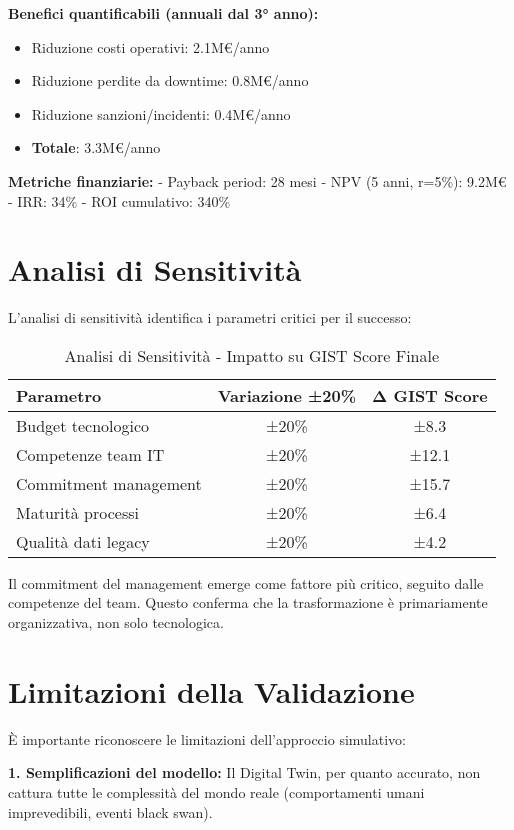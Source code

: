 \textbf{Benefici quantificabili (annuali dal 3° anno):}
\begin{itemize}
\item Riduzione costi operativi: 2.1M€/anno
\item Riduzione perdite da downtime: 0.8M€/anno
\item Riduzione sanzioni/incidenti: 0.4M€/anno
\item \textbf{Totale}: 3.3M€/anno
\end{itemize}

\textbf{Metriche finanziarie:}
- Payback period: 28 mesi
- NPV (5 anni, r=5\%): 9.2M€
- IRR: 34\%
- ROI cumulativo: 340\%

\section{Analisi di Sensitività}
\label{sec:sensitivita}

L'analisi di sensitività identifica i parametri critici per il successo:

\begin{table}[htbp]
\centering
\caption{Analisi di Sensitività - Impatto su GIST Score Finale}
\label{tab:sensitivity}
\begin{tabular}{lcc}
\toprule
\textbf{Parametro} & \textbf{Variazione ±20\%} & \textbf{Δ GIST Score} \\
\midrule
Budget tecnologico & ±20\% & ±8.3 \\
Competenze team IT & ±20\% & ±12.1 \\
Commitment management & ±20\% & ±15.7 \\
Maturità processi & ±20\% & ±6.4 \\
Qualità dati legacy & ±20\% & ±4.2 \\
\bottomrule
\end{tabular}
\end{table}

Il commitment del management emerge come fattore più critico, seguito dalle competenze del team. Questo conferma che la trasformazione è primariamente organizzativa, non solo tecnologica.

\section{Limitazioni della Validazione}
\label{sec:limitazioni}

È importante riconoscere le limitazioni dell'approccio simulativo:

\textbf{1. Semplificazioni del modello:} Il Digital Twin, per quanto accurato, non cattura tutte le complessità del mondo reale (comportamenti umani imprevedibili, eventi black swan).

